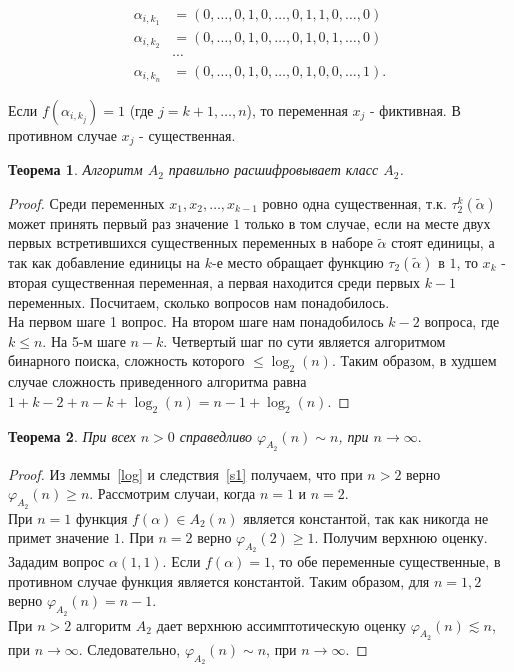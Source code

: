 \documentclass[oneside, final, 14pt]{extreport}
\newtheorem{thm}{Теорема}
\begin{document}
	 \begin{displaymath}
	 \begin{aligned}
	 	\alpha_{i,k_1} & = (0, \ldots,0, 1, 0, \ldots, 0, 1, 1, 0, \ldots, 0) \\
	 	\alpha_{i,k_2} & = (0, \ldots,0, 1, 0, \ldots, 0, 1, 0, 1, \ldots, 0) \\
	 	                    & \cdots \\
	 	\alpha_{i,k_n} & = (0, \ldots,0, 1, 0, \ldots, 0, 1, 0, 0, \ldots, 1).
	 \end{aligned}
	 \end{displaymath}	
	 
	Если $f(\alpha_{i,k_j}) = 1$ (где $j = k+1, \ldots, n$), то переменная $x_j$ - фиктивная. В противном случае $x_j$ - существенная.	
	\begin{thm} 
		Алгоритм $A_2$ правильно расшифровывает класс $A_2$. 
	\end{thm}
	\begin{proof}
		Среди переменных $x_1, x_2, \ldots, x_{k-1}$ ровно одна существенная, т.к. $\tau_2^k(\tilde\alpha)$ может принять первый раз значение $1$ только в 
		том случае, если на месте двух первых встретившихся существенных переменных в наборе $\tilde\alpha$ стоят единицы, 
		а так как добавление единицы на $k$-е место обращает функцию $\tau_2(\tilde\alpha)$ в $1$, то $x_k$ -  вторая существенная переменная, 
		а первая находится среди первых $k-1$ переменных. 	Посчитаем, сколько вопросов нам понадобилось. \\
		На первом шаге 1 вопрос. На втором шаге нам понадобилось $k-2$ вопроса, где $k \leq n$. На 5-м шаге  $n-k$. Четвертый шаг по сути является
		алгоритмом бинарного поиска, сложность которого $ \leq \log_2(n)$. Таким образом, в худшем случае сложность приведенного алгоритма равна 
		$1 + k - 2 + n - k + \log_2(n) = n - 1 + \log_2(n)$. 
	\end{proof} 	
	\begin{thm} 
		При всех $n > 0$ справедливо $\varphi_{A_2}(n) \sim n$, при $n \rightarrow \infty.$
	\end{thm}
	\begin{proof}
		Из леммы~\ref{log} и следствия~\ref{s1} получаем, что  при $n > 2$ верно $\varphi_{A_2}(n) \geq n$. Рассмотрим случаи, когда $n=1$ и $n=2$. \\
	    При $n = 1$ функция $f(\alpha) \in A_2(n)$ является константой, так как никогда не примет значение $1$. При $n=2$ верно $\varphi_{A_2}(2) \geq 1$. 
	    Получим верхнюю оценку. Зададим вопрос $\alpha(1, 1).$ Если $f(\alpha) = 1$, то обе переменные существенные, в противном случае функция является
	    константой. Таким образом, для $n = 1,2$ верно $\varphi_{A_2}(n) = n-1$.\\
	    При $n > 2$ алгоритм $A_2$ дает верхнюю ассимптотическую  оценку $\varphi_{A_2}(n) \lesssim n$, при $n \rightarrow \infty.$ Следовательно,
	    $\varphi_{A_2}(n) \sim n$, при $n \rightarrow \infty.$
	\end{proof}	
\end{document}
